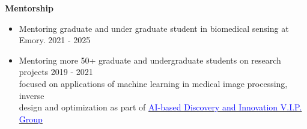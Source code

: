 \documentclass[margin, line]{res}
\newenvironment{list1}{
  \begin{list}{\ding{113}}{%
      \setlength{\itemsep}{0in}
      \setlength{\parsep}{0in} \setlength{\parskip}{0in}
      \setlength{\topsep}{0in} \setlength{\partopsep}{0in} 
      \setlength{\leftmargin}{0.17in}}}{\end{list}}
\begin{document}
\begin{resume}
\begin{list1}
    
    \item[] \textbf{Mentorship} 
        \begin{itemize}
    \item  Mentoring graduate and under graduate student in biomedical sensing at Emory. \hspace*{\fill} 2021 - 2025
    \item Mentoring more 50+ graduate and undergraduate students on research projects \hspace*{\fill} 2019 - 2021 \\focused on applications of machine learning in medical image processing, inverse \\design and optimization as part of \href{https://www.vip.gatech.edu/teams/vwi} {\textcolor{blue}{AI-based Discovery and Innovation V.I.P. Group}} 









	

\end{itemize}
\end{list1}
\end{resume}
\end{document}
